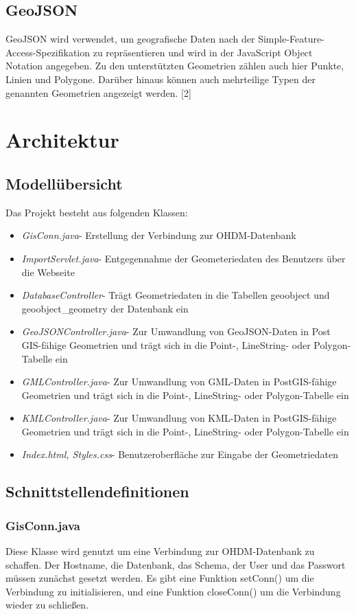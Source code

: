 \documentclass[]{article}
\begin{document}
\subsection{GeoJSON}
GeoJSON wird verwendet, um geografische Daten nach der Simple-Feature-Access-Spezifikation zu repräsentieren und wird in der JavaScript Object Notation angegeben. Zu den unterstützten Geometrien zählen auch hier Punkte, Linien und Polygone. Darüber hinaus können auch mehrteilige Typen der genannten Geometrien angezeigt werden. [2]

\section{Architektur}
\subsection{Modellübersicht}
Das Projekt besteht aus folgenden Klassen:
\begin{itemize}
	\item \textit{GisConn.java}- Erstellung der Verbindung zur OHDM-Datenbank
	\item \textit{ImportServlet.java}- Entgegennahme der Geometeriedaten des Benutzers über die Webseite
	\item \textit{DatabaseController}- Trägt Geometriedaten in die Tabellen geoobject und geoobject\_geometry der Datenbank ein
	\item \textit{GeoJSONController.java}- Zur Umwandlung von GeoJSON-Daten in Post\\GIS-fähige Geometrien und trägt sich in die Point-, LineString- oder Polygon-Tabelle ein
	\item \textit{GMLController.java}- Zur Umwandlung von GML-Daten in PostGIS-fähige Geometrien und trägt sich in die Point-, LineString- oder Polygon-Tabelle ein
	\item \textit{KMLController.java}- Zur Umwandlung von KML-Daten in PostGIS-fähige Geometrien und trägt sich in die Point-, LineString- oder Polygon-Tabelle ein
	\item \textit{Index.html, Styles.css}- Benutzeroberfläche zur Eingabe der Geometriedaten
\end{itemize}

\subsection{Schnittstellendefinitionen}
\subsubsection{GisConn.java}
Diese Klasse wird genutzt um eine Verbindung zur OHDM-Datenbank zu schaffen. Der Hostname, die Datenbank, das Schema, der User und das Passwort müssen zunächst gesetzt werden. Es gibt eine Funktion setConn() um die Verbindung zu initialisieren, und eine Funktion closeConn() um die Verbindung wieder zu schließen. 
\end{document}
